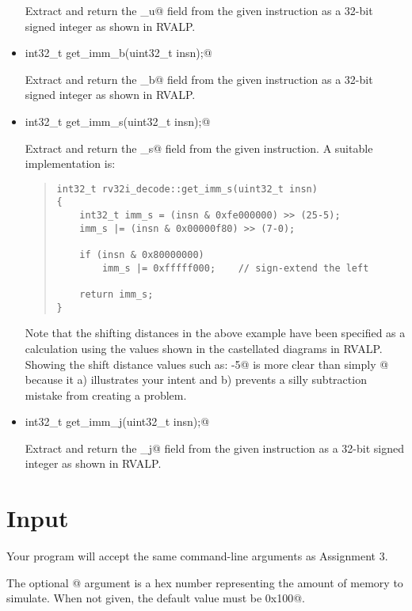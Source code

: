 \documentclass[11pt]{article}
\begin{document}
\begin{itemize}
Extract and return the \verb@imm_u@ field from the given instruction
as a 32-bit signed integer as shown in RVALP.

\item \verb@static int32_t get_imm_b(uint32_t insn);@

Extract and return the \verb@imm_b@ field from the given instruction
as a 32-bit signed integer as shown in RVALP.

\item \verb@static int32_t get_imm_s(uint32_t insn);@

Extract and return the \verb@imm_s@ field from the given instruction.
A suitable implementation is:

\begin{quote}
{\small
\begin{verbatim}
int32_t rv32i_decode::get_imm_s(uint32_t insn)
{
    int32_t imm_s = (insn & 0xfe000000) >> (25-5);
    imm_s |= (insn & 0x00000f80) >> (7-0);

    if (insn & 0x80000000)
        imm_s |= 0xfffff000;    // sign-extend the left

    return imm_s;
}
\end{verbatim}
}
\end{quote}

Note that the shifting distances in the above example have been specified as a
calculation using the values
shown in the castellated diagrams in RVALP.  Showing the shift distance values 
such as: -5@ is more clear than simply @ because it a) illustrates 
your intent and b) prevents a silly subtraction mistake from creating a problem.

\item \verb@static int32_t get_imm_j(uint32_t insn);@

Extract and return the \verb@imm_j@ field from the given instruction
as a 32-bit signed integer as shown in RVALP.

\end{itemize}


\section{Input}

Your program will accept the same command-line arguments as Assignment 3.

The optional @ argument is a hex number representing 
the amount of memory to simulate. When not given, the default value must be 
\verb@0x100@.
\end{document}
